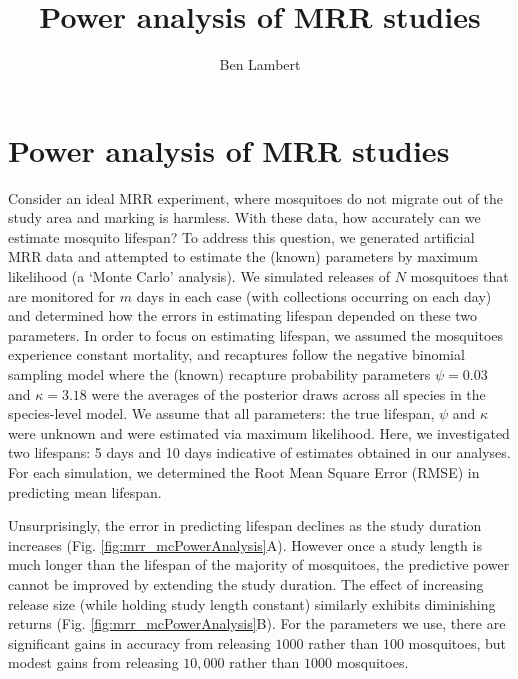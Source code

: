 \documentclass[12pt]{article}
\title{Power analysis of MRR studies}
\author{Ben Lambert}
\begin{document}
\section{Power analysis of MRR studies}
Consider an ideal MRR experiment, where mosquitoes do not migrate out of the study area and marking is harmless. With these data, how accurately can we estimate mosquito lifespan? To address this question, we generated artificial MRR data and attempted to estimate the (known) parameters by maximum likelihood (a `Monte Carlo' analysis). We simulated releases of $N$ mosquitoes that are monitored for $m$ days in each case (with collections occurring on each day) and determined how the errors in estimating lifespan depended on these two parameters. In order to focus on estimating lifespan, we assumed the mosquitoes experience constant mortality, and recaptures follow the negative binomial sampling model where the (known) recapture probability parameters $\psi=0.03$ and $\kappa=3.18$ were the averages of the posterior draws across all species in the species-level model. We assume that all parameters: the true lifespan, $\psi$ and $\kappa$ were unknown and were estimated via maximum likelihood. Here, we investigated two lifespans: 5 days and 10 days indicative of estimates obtained in our analyses. For each simulation, we determined the Root Mean Square Error (RMSE) in predicting mean lifespan.

Unsurprisingly, the error in predicting lifespan declines as the study duration increases (Fig. \ref{fig:mrr_mcPowerAnalysis}A). However once a study length is much longer than the lifespan of the majority of mosquitoes, the predictive power cannot be improved by extending the study duration. The effect of increasing release size (while holding study length constant) similarly exhibits diminishing returns (Fig. \ref{fig:mrr_mcPowerAnalysis}B). For the parameters we use, there are significant gains in accuracy from releasing $1000$ rather than $100$ mosquitoes, but modest gains from releasing $10,000$ rather than $1000$ mosquitoes.
\end{document}
